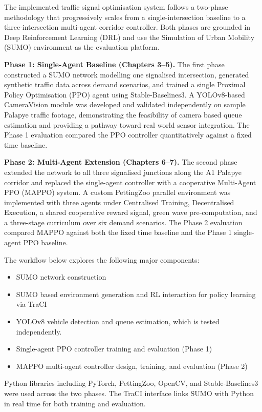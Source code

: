 ﻿\documentclass[11pt, a4paper]{report}
\begin{document}
The implemented traffic signal optimisation system follows a two-phase methodology that progressively scales from a single-intersection baseline to a three-intersection multi-agent corridor controller. Both phases are grounded in Deep Reinforcement Learning (DRL) and use the Simulation of Urban Mobility (SUMO) environment as the evaluation platform.

\textbf{Phase 1: Single-Agent Baseline (Chapters 3--5).} The first phase constructed a SUMO network modelling one signalised intersection, generated synthetic traffic data across demand scenarios, and trained a single Proximal Policy Optimisation (PPO) agent using Stable-Baselines3. A YOLOv8-based CameraVision module was developed and validated independently on sample Palapye traffic footage, demonstrating the feasibility of camera based queue estimation and providing a pathway toward real world sensor integration. The Phase 1 evaluation compared the PPO controller quantitatively against a fixed time baseline.

\textbf{Phase 2: Multi-Agent Extension (Chapters 6--7).} The second phase extended the network to all three signalised junctions along the A1 Palapye corridor and replaced the single-agent controller with a cooperative Multi-Agent PPO (MAPPO) system. A custom PettingZoo parallel environment was implemented with three agents under Centralised Training, Decentralised Execution, a shared cooperative reward signal, green wave pre-computation, and a three-stage curriculum over six demand scenarios. The Phase 2 evaluation compared MAPPO against both the fixed time baseline and the Phase 1 single-agent PPO baseline.

The workflow below explores the following major components:

\begin{itemize}
    \item SUMO network construction 
    \item SUMO based environment generation and RL interaction for policy learning via TraCI
    \item YOLOv8 vehicle detection and queue estimation, which is tested independently.
    \item Single-agent PPO controller training and evaluation (Phase 1)
    \item MAPPO multi-agent controller design, training, and evaluation (Phase 2)
\end{itemize}

Python libraries including PyTorch, PettingZoo, OpenCV, and Stable-Baselines3 were used across the two phases. The TraCI interface links SUMO with Python in real time for both training and evaluation.
\end{document}
